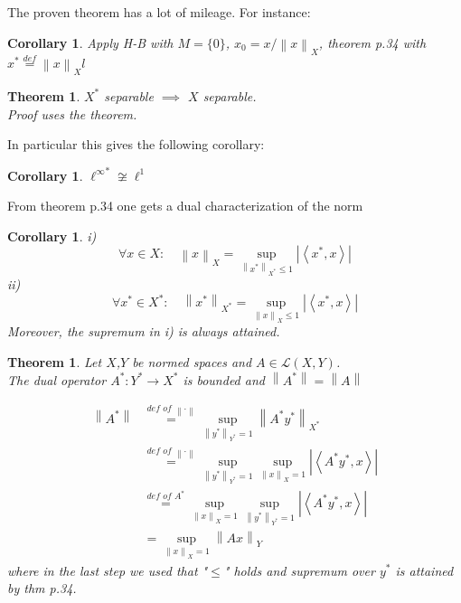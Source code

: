 \documentclass{article}
\newcommand{\nextline}{\hfill\break}
\newcommand{\inne}[2]{\left<{#1},{#2}\right>}
\newcommand{\norm}[1]{\left\|{#1}\right\|}
\newcommand{\dual}[1]{{#1}^*}
\newcommand{\func}[3]{${#1}:{#2}\xrightarrow{}{#3}$}
\newtheorem{theorem}[example]{Theorem}
\newtheorem{corollary}[example]{Corollary}
\begin{document}
    The proven theorem has a lot of mileage. For instance:
    \begin{corollary}\rm\nextline
        Apply H-B with $M=\{0\}$, $x_0=x/{\norm{x}_X}$, theorem p.34 with $\dual x\stackrel{def}{=}\norm{x}_Xl$
    \end{corollary}

        \begin{theorem}\rm\nextline
            $\dual X$ separable $\implies$ $X$ separable.
            \\
            Proof uses the theorem.
        \end{theorem}
In particular this gives the following corollary:
\begin{corollary}\rm\nextline
    $\dual{\ell^\infty}\not\cong \ell^1$
\end{corollary}
From theorem p.34 one gets a dual characterization of the norm
\begin{corollary}\rm\nextline
    i) 
    $$
    \forall x\in X:\quad\norm{x}_X=\sup_{\norm{\dual x}_{\dual X}\leq1}|\inne{\dual x}{x}|
    $$
     ii) 
     $$
     \forall {\dual x}\in {\dual X}:\quad\norm{{\dual x}}_{\dual X}=\sup_{\norm{x}_{X}\leq1}|\inne{\dual x}{x}|$$
Moreover, the supremum in i) is always attained.
\begin{pf}{}{}
    
\end{pf}

\end{corollary}

\begin{theorem}\rm\nextline
    Let $X$,$Y$ be normed spaces and $A\in\mathcal{L}(X,Y)$.\\ The dual operator \func{\dual A}{\dual Y}{\dual X} is bounded and $\norm{\dual A}=\norm{A}$
    \begin{pf}{}{}
        \begin{equation}
            \begin{split}
                \norm{\dual A}&\stackrel{\textit{def of } \norm{\cdot}}{=}\sup_{\norm{\dual y}_{\dual Y}=1}\norm{\dual A\dual y}_{\dual X}\\
                &\stackrel{\textit{def of }\norm{\cdot}}{=}\sup_{\norm{\dual y}_{\dual Y}=1}\sup_{\norm{x}_X=1}|\inne{\dual A\dual y}{x}|\\
                &\stackrel{\textit{def of }\dual A}{=}\sup_{\norm{x}_X=1}\sup_{\norm{\dual y}_{\dual Y}=1}|\inne{\dual A\dual y}{x}|\\
                &=\sup_{\norm{x}_X=1}\norm{Ax}_Y
            \end{split}
        \end{equation}
        where in the last step we used  that "$\leq$" holds and supremum over $\dual y$ is attained by thm p.34.
    \end{pf}
\end{theorem}
\end{document}
